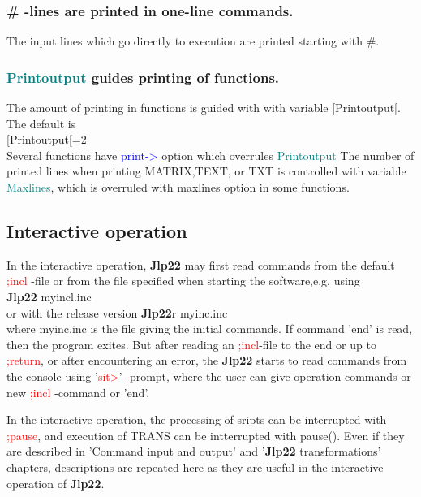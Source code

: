 \subsubsection{\# -lines are printed in one-line commands.}
\label{printcommand}
The input lines which go directly to execution are printed starting with \#.
\subsubsection{\textcolor{teal}{Printoutput} guides printing of functions.}
\label{printoutput}
The amount of printing in functions is guided with with variable [Printoutput[.
The default is \\
[Printoutput[=2\\
Several functions have \textcolor{blue}{print->} option which overrules \textcolor{teal}{Printoutput}
The number of printed lines when printing MATRIX,TEXT, or TXT is controlled with
variable \textcolor{teal}{Maxlines}, which is overruled with maxlines option in some functions.
\subsection{Interactive operation}
\label{interactive}
In the interactive operation, \textbf{Jlp22} may first read commands from the
default \textcolor{Red}{;incl} -file or from the file specified when starting the software,e.g. using\\
\textbf{Jlp22} myincl.inc \\
or with the release version
\textbf{Jlp22}r myinc.inc\\
where myinc.inc is the file giving the initial commands. If command 'end' is read, then the program exites.
But after reading an \textcolor{Red}{;incl}-file to the end or up to \textcolor{Red}{;return}, or after encountering an error, the \textbf{Jlp22} starts
to read commands from the console using '\textcolor{Red}{sit>}' -prompt, where the user can give
operation commands or new \textcolor{Red}{;incl} -command or 'end'.

In the interactive operation, the processing of sripts can be interrupted with \textcolor{Red}{;pause}, and
execution of TRANS can be intterrupted with \textcolor{VioletRed}{pause}(). Even if they are described in
'Command input and output' and '\textbf{Jlp22} transformations' chapters, descriptions
are repeated here as they are useful in the interactive operation of \textbf{Jlp22}.
